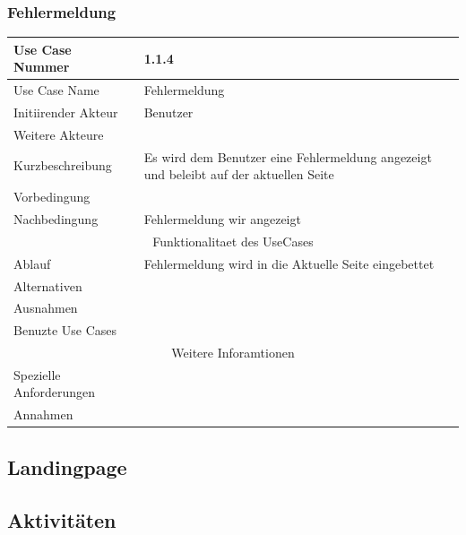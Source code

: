 \documentclass[10pt,a4paper]{article}
\begin{document}
	\subsubsection{Fehlermeldung}
		\begin{tabular}{|l|p{.5\linewidth}|}
		\hline Use Case Nummer & 1.1.4 \\ 
		\hline Use Case Name & Fehlermeldung \\ 
		\hline Initiirender Akteur & Benutzer \\
		\hline Weitere Akteure &  \\
		\hline Kurzbeschreibung & Es wird dem Benutzer eine Fehlermeldung angezeigt und beleibt auf der aktuellen Seite \\
		\hline Vorbedingung &  \\
		\hline Nachbedingung & Fehlermeldung wir angezeigt \\
		\hline \multicolumn{2}{|c|}{Funktionalitaet des UseCases}\\
		\hline Ablauf & Fehlermeldung wird in die Aktuelle Seite eingebettet \\
		\hline Alternativen &  \\
		\hline Ausnahmen &  \\
		\hline Benuzte Use Cases &  \\
		\hline \multicolumn{2}{|c|}{Weitere Inforamtionen} \\
		\hline Spezielle Anforderungen &  \\
		\hline Annahmen &  \\
		\hline
		\end{tabular} 
\subsection{Landingpage}
\subsection{Aktivit\"aten}
\end{document}
